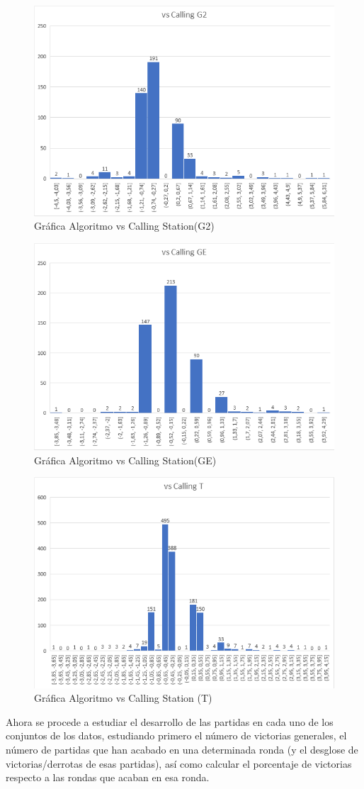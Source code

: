 \begin{figure}[h]
\centering
\includegraphics[width=.6\textwidth]{figuras/AvCG2.png}   
\caption{Gráfica Algoritmo vs Calling Station(G2)}
\label{fig:AvRC2}
\end{figure}


\begin{figure}[h]
\centering
\includegraphics[width=.6\textwidth]{figuras/AvCGE.png}   
\caption{Gráfica Algoritmo vs Calling Station(GE)}
\label{fig:AvRCE}
\end{figure}

\begin{figure}[h]
\centering
\includegraphics[width=.6\textwidth]{figuras/AvCT.png}   
\caption{Gráfica Algoritmo vs Calling Station (T)}
\label{fig:AvRCT}
\end{figure}

Ahora se procede a estudiar el desarrollo de las partidas en cada uno de los conjuntos de los datos, estudiando primero el número de victorias generales, el número de partidas que han acabado en una determinada ronda (y el desglose de victorias/derrotas de esas partidas), así como calcular el porcentaje de victorias respecto a las rondas que acaban en esa ronda.



